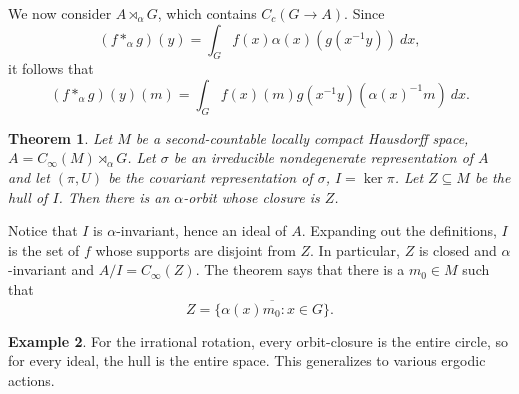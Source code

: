 \documentclass[12pt]{report}
\newtheorem{theorem}{Theorem}[chapter]
\theoremstyle{definition}
\newtheorem{example}[theorem]{Example}
\begin{document}
    We now consider $A \rtimes_\alpha G$, which contains $C_c(G \to A)$. Since
    $$(f *_\alpha g)(y) = \int_G f(x)\alpha(x)(g(x^{-1}y)) ~dx,$$
    it follows that
    $$(f *_\alpha g)(y)(m) = \int_G f(x)(m) g(x^{-1}y)(\alpha(x)^{-1}m) ~dx.$$
\begin{theorem}
    Let $M$ be a second-countable locally compact Hausdorff space, $A = C_\infty(M) \rtimes_\alpha G$. Let $\sigma$ be an irreducible nondegenerate representation of $A$ and let $(\pi, U)$ be the covariant representation of $\sigma$, $I = \ker \pi$. Let $Z \subseteq M$ be the hull of $I$. Then there is an $\alpha$-orbit whose closure is $Z$.
\end{theorem}
    Notice that $I$ is $\alpha$-invariant, hence an ideal of $A$. Expanding out the definitions, $I$ is the set of $f$ whose supports are disjoint from $Z$. In particular, $Z$ is closed and $\alpha$-invariant and $A/I = C_\infty(Z)$. The theorem says that there is a $m_0 \in M$ such that
    $$Z = \overline{\{\alpha(x)m_0: x \in G\}}.$$
\begin{example}
    For the irrational rotation, every orbit-closure is the entire circle, so for every ideal, the hull is the entire space. This generalizes to various ergodic actions.
\end{example}
\end{document}

